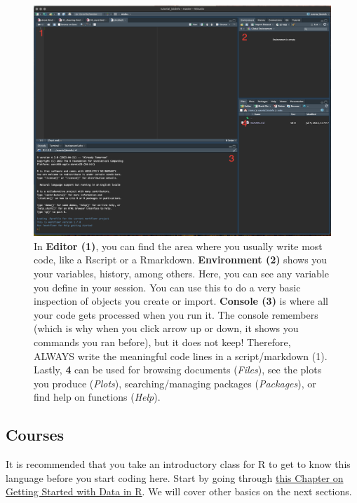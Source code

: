 \documentclass[
]{book}
\begin{document}
\begin{figure}
\centering
\includegraphics{figures/RstudioLayout.png}
\caption{In \textbf{Editor (1)}, you can find the area where you usually write most code, like a Rscript or a Rmarkdown. \textbf{Environment (2)} shows you your variables, history, among others. Here, you can see any variable you define in your session. You can use this to do a very basic inspection of objects you create or import. \textbf{Console (3)} is where all your code gets processed when you run it. The console remembers (which is why when you click arrow up or down, it shows you commands you ran before), but it does not keep! Therefore, ALWAYS write the meaningful code lines in a script/markdown (1). Lastly, \textbf{4} can be used for browsing documents (\emph{Files}), see the plots you produce (\emph{Plots}), searching/managing packages (\emph{Packages}), or find help on functions (\emph{Help}).}
\end{figure}

\hypertarget{courses}{%
\subsection*{Courses}\label{courses}}

It is recommended that you take an introductory class for R to get to know this language before you start coding here.
Start by going through \href{https://moderndive.netlify.app/1-getting-started}{this Chapter on Getting Started with Data in R}.
We will cover other basics on the next sections.
\end{document}
